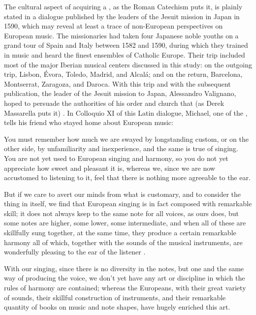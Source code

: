 
The cultural aspect of acquiring a , as the Roman
Catechism puts it, is plainly stated in a dialogue published by the leaders of
the Jesuit mission in Japan in 1590, which may reveal at least a trace of
non-European perspectives on European music.%
    \Autocite{Sande:DeMissioneLegatorum}
The missionaries had taken four Japanese noble youths on a grand tour of Spain
and Italy between 1582 and 1590, during which they trained in music and heard
the finest ensembles of Catholic Europe.
Their trip included most of the major Iberian musical centers discussed in this
study: on the outgoing trip, Lisbon, Évora, Toledo, Madrid, and Alcalá; and on
the return, Barcelona, Montserrat, Zaragoza, and Daroca.
With this trip and with the subsequent publication, the leader of the Jesuit
mission to Japan, Alessandro Valignano, hoped to persuade the authorities of his
order and church that (as Derek Massarella puts it) .%
    \Autocite[4]{Massarella:JapaneseTravellers}
In Colloquio XI of this Latin dialogue, Michael, one of the
, tells his friend who stayed home about European music:
\begin{quoting}
    You must remember \Dots{} how much we are swayed by longstanding custom, or
    on the other side, by unfamiliarity and inexperience, and the same is true
    of singing.
    You are not yet used to European singing and harmony, so you do not yet
    appreciate how sweet and pleasant it is, whereas we, since we are now
    accustomed to listening to it, feel that there is nothing more agreeable to
    the ear.

    But if we care to avert our minds from what is customary, and to consider
    the thing in itself, we find that European singing is in fact composed with
    remarkable skill; it does not always keep to the same note for all voices,
    as ours does, but some notes are higher, some lower, some intermediate, and
    when all of these are skillfully sung together, at the same time, they
    produce a certain remarkable harmony \Dots{} all of which, \Dots{} together
    with the sounds of the musical instruments, are wonderfully pleasing to the
    ear of the listener \Dots{}.

    With our singing, since there is no diversity in the notes, but one and the
    same way of producing the voice, we don't yet have any art or discipline in
    which the rules of harmony are contained; whereas the Europeans, with their
    great variety of sounds, their skillful construction of instruments, and
    their remarkable quantity of books on music and note shapes, have hugely
    enriched this art.%
        \Autocite[155-156]{Massarella:JapaneseTravellers}
\end{quoting}
